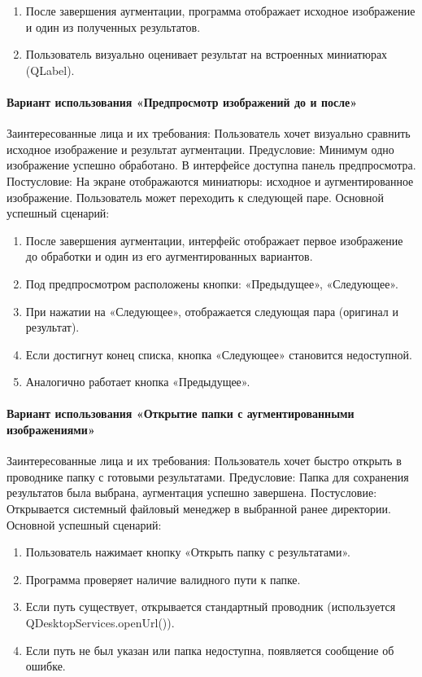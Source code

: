 \begin{enumerate}
	\item После завершения аугментации, программа отображает исходное изображение и один из полученных результатов.
	\item Пользователь визуально оценивает результат на встроенных миниатюрах (QLabel).
\end{enumerate}

\paragraph{Вариант использования «Предпросмотр изображений до и после»}

Заинтересованные лица и их требования:
Пользователь хочет визуально сравнить исходное изображение и результат аугментации.
Предусловие:
Минимум одно изображение успешно обработано. В интерфейсе доступна панель предпросмотра.
Постусловие:
На экране отображаются миниатюры: исходное и аугментированное изображение. Пользователь может переходить к следующей паре.
Основной успешный сценарий:

\begin{enumerate}
	\item После завершения аугментации, интерфейс отображает первое изображение до обработки и один из его аугментированных вариантов.
	\item Под предпросмотром расположены кнопки: «Предыдущее», «Следующее».
	\item При нажатии на «Следующее», отображается следующая пара (оригинал и результат).
	\item Если достигнут конец списка, кнопка «Следующее» становится недоступной.
	\item Аналогично работает кнопка «Предыдущее».
\end{enumerate}

\paragraph{Вариант использования «Открытие папки с аугментированными изображениями»}

Заинтересованные лица и их требования:
Пользователь хочет быстро открыть в проводнике папку с готовыми результатами.
Предусловие:
Папка для сохранения результатов была выбрана, аугментация успешно завершена.
Постусловие:
Открывается системный файловый менеджер в выбранной ранее директории.
Основной успешный сценарий:
\begin{enumerate}
	\item Пользователь нажимает кнопку «Открыть папку с результатами».
	\item Программа проверяет наличие валидного пути к папке.
	\item Если путь существует, открывается стандартный проводник (используется QDesktopServices.openUrl()).
	\item Если путь не был указан или папка недоступна, появляется сообщение об ошибке.
\end{enumerate}

